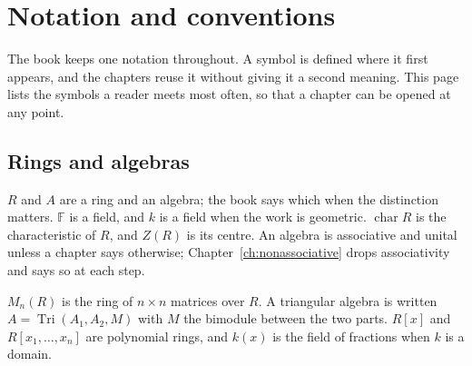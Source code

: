 \chapter*{Notation and conventions}
\label{page:notation}

The book keeps one notation throughout. %
A symbol is defined where it first appears, and the chapters reuse it without %
giving it a second meaning. %
This page lists the symbols a reader meets most often, so that a chapter can be %
opened at any point. %

\section*{Rings and algebras}

$R$ and $A$ are a ring and an algebra; the book says which when the distinction %
matters. $\mathbb{F}$ is a field, and $k$ is a field when the work is %
geometric. $\operatorname{char}R$ is the characteristic of $R$, and $Z(R)$ is %
its centre. %
An algebra is associative and unital unless a chapter says otherwise; %
Chapter~\ref{ch:nonassociative} drops associativity and says so at each step. %

$M_n(R)$ is the ring of $n\times n$ matrices over $R$. %
A triangular algebra is written $A=\operatorname{Tri}(A_1,A_2,M)$ with $M$ the %
bimodule between the two parts. %
$R[x]$ and $R[x_1,\dots,x_n]$ are polynomial rings, and $k(x)$ is the field of %
fractions when $k$ is a domain. %


